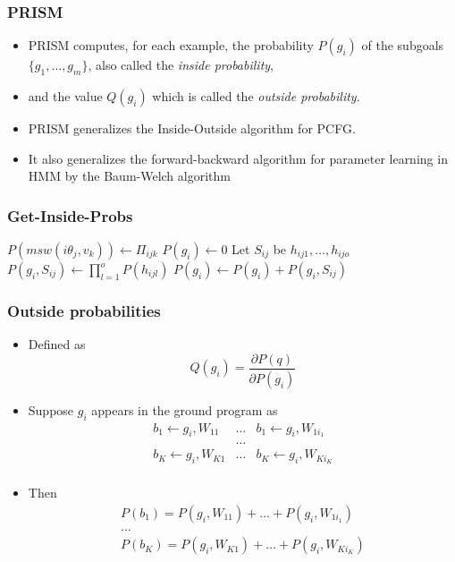 \documentclass[trans,aspectratio=1610]{beamer}
\newcommand{\lpif}{\leftarrow}
\begin{document}
\begin{frame}
  \frametitle{PRISM}
  \begin{itemize}
  \item PRISM  computes, for each example, the probability
$P(g_i)$ 
of the subgoals $\{g_1,\ldots,g_m\}$, also called the \emph{inside probability}, 
\item and the value $Q(g_i)$ which is 
called the
\emph{outside probability}. 
\item  PRISM  generalizes the Inside-Outside algorithm
 for PCFG.
\item  It also generalizes the forward-backward 
 algorithm  for parameter 
learning in HMM by the Baum-Welch algorithm
\end{itemize}
\end{frame}
\begin{frame}
  \frametitle{Get-Inside-Probs}
\begin{algorithmic}[1]
  \State $P(msw(i\theta_j,v_k))\gets \Pi_{ijk}$
\EndFor
{}
  \State   $P(g_i)\gets 0$
    \State Let $S_{ij}$ be $h_{ij1},\ldots,h_{ijo}$
    \State $P(g_i,S_{ij})\gets\prod_{l=1}^{o}P(h_{ijl})$
    \State   $P(g_i)\gets P(g_i)+P(g_i,S_{ij})$  
  \EndFor
\EndFor
\EndProcedure
\end{algorithmic}
\end{frame}
\begin{frame}
  \frametitle{Outside probabilities}
  \begin{itemize}
  \item 
Defined as
$$Q(g_i)=\frac{\partial P(q)}{\partial P(g_i)}$$
\item 
Suppose $g_i$ appears in the  ground program as
$$\begin{array}{ccc}
b_1\lpif g_i, W_{11}& \ldots& b_1\lpif g_i, W_{1i_1}\\
&\ldots&\\
b_K\lpif g_i, W_{K1}& \ldots& b_K\lpif g_i, W_{Ki_K}\\
\end{array}$$
\item Then
$$\begin{array}{c}
P(b_1)=P( g_i, W_{11})+ \ldots+ P(g_i, W_{1i_1})\\
\ldots\\
P(b_K)=P( g_i, W_{K1})+ \ldots+ P(g_i, W_{Ki_K})\\
\end{array}$$
\end{itemize}
\end{frame}
\end{document}
